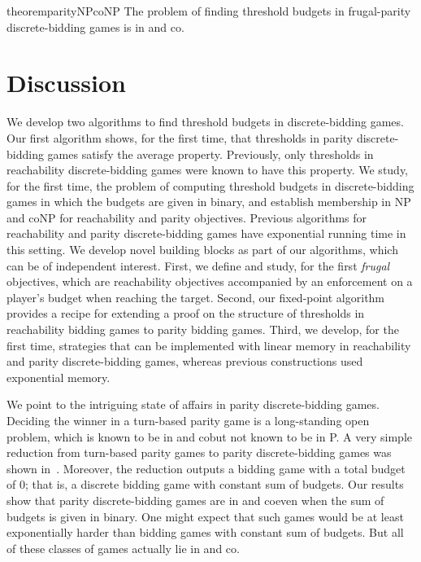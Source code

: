\documentclass{article}\providecommand{\nequiv}{\not\equiv}\usepackage[a4paper,margin=20mm]{geometry}
\begin{document}
\begin{restatable}{theorem}{parityNPcoNP}
	\label{thm:parity-NP-coNP}
	The problem of finding threshold budgets in frugal-parity discrete-bidding games is in \NP and co\NP. 
\end{restatable}

\section{Discussion}
We develop two algorithms to find threshold budgets in discrete-bidding games. Our first algorithm shows, for the first time, that thresholds in parity discrete-bidding games satisfy the average property. Previously, only thresholds in reachability discrete-bidding games were known to have this property. 
We study, for the first time, the problem of computing threshold budgets in discrete-bidding games in which the budgets are given in binary, and establish membership in NP and coNP for reachability and parity objectives. 
Previous algorithms for reachability and parity discrete-bidding games have exponential running time in this setting. 
We develop novel building blocks as part of our algorithms, which can be of independent interest. First, we define and study, for the first {\em frugal} objectives, which are reachability objectives accompanied by an enforcement on a player's budget when reaching the target. Second, our fixed-point algorithm provides a recipe for extending a proof on the structure of thresholds in reachability bidding games to parity bidding games. Third, we develop, for the first time, strategies that can be implemented with linear memory in reachability and parity discrete-bidding games, whereas previous constructions used exponential memory. 


We point to the intriguing state of affairs in parity discrete-bidding games. 
Deciding the winner in a turn-based parity game is a long-standing open problem, which is known to be in \NP and co\NP but not known to be in P. 
A very simple reduction from turn-based parity games to parity discrete-bidding games was shown in~\cite{AAH21}. Moreover, the reduction outputs a bidding game with a total budget of $0$; that is, a discrete bidding game with constant sum of budgets.
Our results show that parity discrete-bidding games are in \NP and co\NP even when the sum of budgets is given in binary. One might expect that such games would be at least exponentially harder than bidding games with constant sum of budgets. But all of these classes of games actually lie in \NP and co\NP. 




\end{document}
